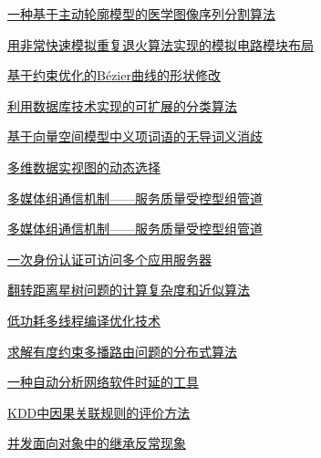 \documentclass[a4paper]{article}
\begin{document}
\href{http://www.jos.org.cn/ch/reader/download_pdf.aspx?file_no=20020603&year_id=2002&quarter_id=6&falg=1}{一种基于主动轮廓模型的医学图像序列分割算法}

\href{http://www.jos.org.cn/ch/reader/download_pdf.aspx?file_no=20020604&year_id=2002&quarter_id=6&falg=1}{用非常快速模拟重复退火算法实现的模拟电路模块布局}

\href{http://www.jos.org.cn/ch/reader/download_pdf.aspx?file_no=20020605&year_id=2002&quarter_id=6&falg=1}{基于约束优化的Bézier曲线的形状修改}

\href{http://www.jos.org.cn/ch/reader/download_pdf.aspx?file_no=20020606&year_id=2002&quarter_id=6&falg=1}{利用数据库技术实现的可扩展的分类算法}

\href{http://www.jos.org.cn/ch/reader/download_pdf.aspx?file_no=20020607&year_id=2002&quarter_id=6&falg=1}{基于向量空间模型中义项词语的无导词义消歧}

\href{http://www.jos.org.cn/ch/reader/download_pdf.aspx?file_no=20020608&year_id=2002&quarter_id=6&falg=1}{多维数据实视图的动态选择}

\href{http://www.jos.org.cn/ch/reader/download_pdf.aspx?file_no=20020609&year_id=2002&quarter_id=6&falg=1}{多媒体组通信机制——服务质量受控型组管道}

\href{http://www.jos.org.cn/ch/reader/download_pdf.aspx?file_no=20020610&year_id=2002&quarter_id=6&falg=1}{多媒体组通信机制——服务质量受控型组管道}

\href{http://www.jos.org.cn/ch/reader/download_pdf.aspx?file_no=20020611&year_id=2002&quarter_id=6&falg=1}{一次身份认证可访问多个应用服务器}

\href{http://www.jos.org.cn/ch/reader/download_pdf.aspx?file_no=20020612&year_id=2002&quarter_id=6&falg=1}{翻转距离星树问题的计算复杂度和近似算法}

\href{http://www.jos.org.cn/ch/reader/download_pdf.aspx?file_no=20020613&year_id=2002&quarter_id=6&falg=1}{低功耗多线程编译优化技术}

\href{http://www.jos.org.cn/ch/reader/download_pdf.aspx?file_no=20020614&year_id=2002&quarter_id=6&falg=1}{求解有度约束多播路由问题的分布式算法}

\href{http://www.jos.org.cn/ch/reader/download_pdf.aspx?file_no=20020615&year_id=2002&quarter_id=6&falg=1}{一种自动分析网络软件时延的工具}

\href{http://www.jos.org.cn/ch/reader/download_pdf.aspx?file_no=20020616&year_id=2002&quarter_id=6&falg=1}{KDD中因果关联规则的评价方法}

\href{http://www.jos.org.cn/ch/reader/download_pdf.aspx?file_no=20020617&year_id=2002&quarter_id=6&falg=1}{并发面向对象中的继承反常现象}
\end{document}
